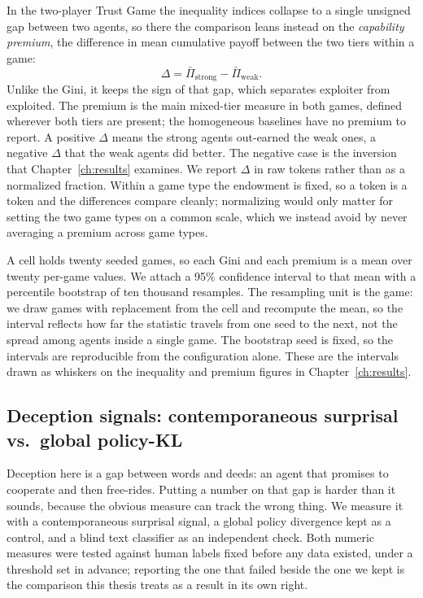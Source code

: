 In the two-player Trust Game the inequality indices collapse to a single unsigned
gap between two agents, so there the comparison leans instead on the
\emph{capability premium}, the difference in mean cumulative payoff between the two
tiers within a game:
\[
  \Delta = \bar{\Pi}_{\mathrm{strong}} - \bar{\Pi}_{\mathrm{weak}}.
\]
Unlike the Gini, it keeps the sign of that gap, which separates exploiter from
exploited. The premium is the main mixed-tier measure in both games, defined
wherever both tiers are present; the homogeneous baselines have no premium to
report. A positive $\Delta$ means the strong agents out-earned the weak ones, a
negative $\Delta$ that the weak agents did better. The negative case is the
inversion that Chapter~\ref{ch:results} examines. We report $\Delta$ in raw tokens
rather than as a normalized fraction. Within a game type the endowment is fixed,
so a token is a token and the differences compare cleanly; normalizing would only
matter for setting the two game types on a common scale, which we instead avoid by
never averaging a premium across game types.

A cell holds twenty seeded games, so each Gini and each premium is a mean over
twenty per-game values. We attach a 95\% confidence interval to that mean with a
percentile bootstrap of ten thousand resamples. The resampling unit is the game:
we draw games with replacement from the cell and recompute the mean, so the
interval reflects how far the statistic travels from one seed to the next, not
the spread among agents inside a single game. The bootstrap seed is fixed, so the
intervals are reproducible from the configuration alone. These are the intervals
drawn as whiskers on the inequality and premium figures in
Chapter~\ref{ch:results}.

\subsection{Deception signals: contemporaneous surprisal vs.\ global policy-KL}
\label{subsec:deception}

Deception here is a gap between words and deeds: an agent that promises to
cooperate and then free-rides. Putting a number on
that gap is harder than it sounds, because the obvious measure can track the
wrong thing. We measure it with a contemporaneous surprisal signal, a global
policy divergence kept as a control, and a blind text classifier as an
independent check. Both numeric measures were tested against human labels fixed
before any data existed, under a threshold set in advance; reporting the one that
failed beside the one we kept is the comparison this thesis treats as a result in
its own right.

